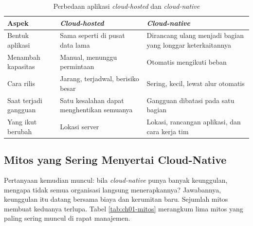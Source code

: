 \begin{table}[!htb]
  \centering
  \small
  \caption{Perbedaan aplikasi \textit{cloud-hosted} dan \textit{cloud-native}}
  \label{tab:ch01-hosted-native}
  \begin{tabularx}{\textwidth}{P{2.4cm}LL}
    \hline
    \textbf{Aspek} & \textbf{\textit{Cloud-hosted}} & \textbf{\textit{Cloud-native}} \\
    \hline
    Bentuk aplikasi & Sama seperti di pusat data lama & Dirancang ulang menjadi bagian
      yang longgar keterkaitannya \\
    \hline
    Menambah kapasitas & Manual, menunggu permintaan & Otomatis mengikuti beban \\
    \hline
    Cara rilis & Jarang, terjadwal, berisiko besar & Sering, kecil, lewat alur
      otomatis \\
    \hline
    Saat terjadi gangguan & Satu kesalahan dapat menghentikan semuanya & Gangguan
      dibatasi pada satu bagian \\
    \hline
    Yang ikut berubah & Lokasi server & Lokasi, rancangan aplikasi, dan cara kerja
      tim \\
    \hline
  \end{tabularx}
\end{table}

\subsection{Mitos yang Sering Menyertai Cloud-Native}

Pertanyaan kemudian muncul: bila \textit{cloud-native} punya banyak keunggulan, mengapa
tidak semua organisasi langsung menerapkannya? Jawabannya, keunggulan itu datang
bersama biaya dan kerumitan baru. Sejumlah mitos membuat keduanya terlupa. Tabel
\ref{tab:ch01-mitos} merangkum lima mitos yang paling sering muncul di rapat
manajemen.

